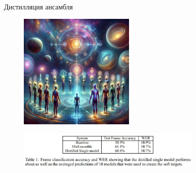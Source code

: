 \documentclass[9pt]{beamer}
\begin{document}
\begin{frame}{Дистилляция ансамбля~\cite{hinton2015distilling}}
    \begin{figure}
        \centering
        \includegraphics[width=0.5\textwidth]{images/image8.png}
    \end{figure}

    \begin{figure}
        \centering
        \includegraphics[width=0.8\textwidth]{images/image9.jpg}
    \end{figure}
\end{frame}




\end{document}
